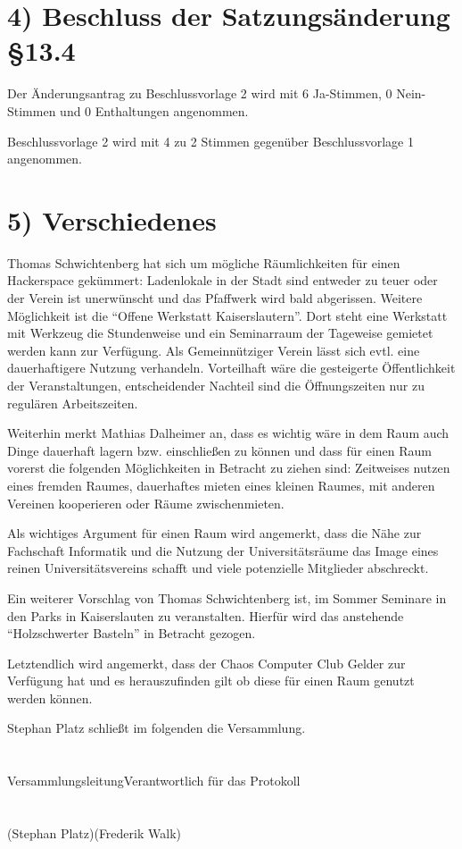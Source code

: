 \documentclass{scrartcl}
\begin{document}
\section*{4) Beschluss der Satzungsänderung \S13.4}
    
    Der Änderungsantrag zu Beschlussvorlage 2 wird mit 6 Ja-Stimmen, 0 Nein-Stimmen und 0 Enthaltungen angenommen.

    Beschlussvorlage 2 wird mit 4 zu 2 Stimmen gegenüber Beschlussvorlage 1 angenommen.

\section*{5) Verschiedenes}

    Thomas Schwichtenberg hat sich um mögliche Räumlichkeiten für einen Hackerspace gekümmert: Ladenlokale in der Stadt sind entweder zu teuer oder der Verein ist unerwünscht und das Pfaffwerk wird bald abgerissen. Weitere Möglichkeit ist die ``Offene Werkstatt Kaiserslautern''. Dort steht eine Werkstatt mit Werkzeug die Stundenweise und ein Seminarraum der Tageweise gemietet werden kann zur Verfügung. Als Gemeinnütziger Verein lässt sich evtl. eine dauerhaftigere Nutzung verhandeln. Vorteilhaft wäre die gesteigerte Öffentlichkeit der Veranstaltungen, entscheidender Nachteil sind die Öffnungszeiten nur zu regulären Arbeitszeiten.

    Weiterhin merkt Mathias Dalheimer an, dass es wichtig wäre in dem Raum auch Dinge dauerhaft lagern bzw. einschließen zu können und dass für einen Raum vorerst die folgenden Möglichkeiten in Betracht zu ziehen sind: Zeitweises nutzen eines fremden Raumes, dauerhaftes mieten eines kleinen Raumes, mit anderen Vereinen kooperieren oder Räume zwischenmieten.

    Als wichtiges Argument für einen Raum wird angemerkt, dass die Nähe zur Fachschaft Informatik und die Nutzung der Universitätsräume das Image eines reinen Universitätsvereins schafft und viele potenzielle Mitglieder abschreckt.

    Ein weiterer Vorschlag von Thomas Schwichtenberg ist, im Sommer Seminare in den Parks in Kaiserslauten zu veranstalten. Hierfür wird das anstehende ``Holzschwerter Basteln'' in Betracht gezogen.

    Letztendlich wird angemerkt, dass der Chaos Computer Club Gelder zur Verfügung hat und es herauszufinden gilt ob diese für einen Raum genutzt werden können.

    Stephan Platz schließt im folgenden die Versammlung.
\section*{}

Versammlungsleitung\hspace{5cm}Verantwortlich für das Protokoll\\
\\
\\
(Stephan Platz)\hspace{5.9cm}(Frederik Walk)
\\
\\
\end{document}
